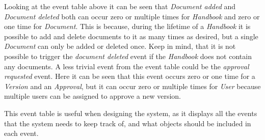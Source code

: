Looking at the event table above it can be seen that \textit{Document added} and \textit{Document deleted} both can occur zero or multiple times for \textit{Handbook} and zero or one time for \textit{Document}.
This is because, during the lifetime of a \textit{Handbook} it is possible to add and delete documents to it as many times as desired, but a single \textit{Document} can only be added or deleted once.
Keep in mind, that it is not possible to trigger the \textit{document deleted} event if the \textit{Handbook} does not contain any documents.
A less trivial event from the event table could be the \textit{approval requested} event.
Here it can be seen that this event occurs zero or one time for a \textit{Version} and an \textit{Approval}, but it can occur zero or multiple times for \textit{User} because multiple users can be assigned to approve a new version.

This event table is useful when designing the system, as it displays all the events that the system needs to keep track of, and what objects should be included in each event.

